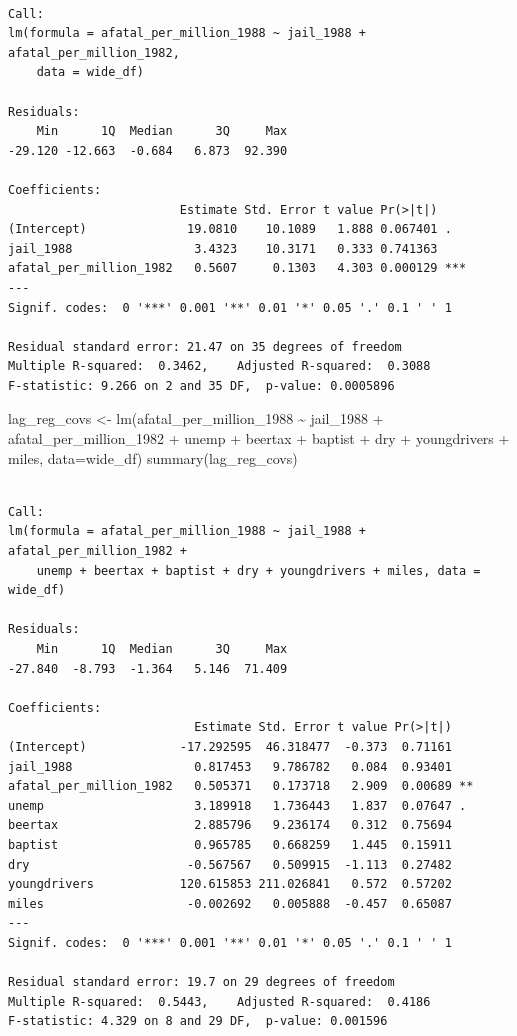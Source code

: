 \documentclass[
  letterpaper,
  DIV=11,
  numbers=noendperiod]{scrreprt}
\newenvironment{Shaded}{\begin{snugshade}}{\end{snugshade}}
\newcommand{\AttributeTok}[1]{\textcolor[rgb]{0.40,0.45,0.13}{#1}}
\newcommand{\FunctionTok}[1]{\textcolor[rgb]{0.28,0.35,0.67}{#1}}
\newcommand{\NormalTok}[1]{\textcolor[rgb]{0.00,0.23,0.31}{#1}}
\newcommand{\OtherTok}[1]{\textcolor[rgb]{0.00,0.23,0.31}{#1}}
\newcommand{\SpecialCharTok}[1]{\textcolor[rgb]{0.37,0.37,0.37}{#1}}
\begin{document}
\begin{verbatim}

Call:
lm(formula = afatal_per_million_1988 ~ jail_1988 + afatal_per_million_1982, 
    data = wide_df)

Residuals:
    Min      1Q  Median      3Q     Max 
-29.120 -12.663  -0.684   6.873  92.390 

Coefficients:
                        Estimate Std. Error t value Pr(>|t|)    
(Intercept)              19.0810    10.1089   1.888 0.067401 .  
jail_1988                 3.4323    10.3171   0.333 0.741363    
afatal_per_million_1982   0.5607     0.1303   4.303 0.000129 ***
---
Signif. codes:  0 '***' 0.001 '**' 0.01 '*' 0.05 '.' 0.1 ' ' 1

Residual standard error: 21.47 on 35 degrees of freedom
Multiple R-squared:  0.3462,    Adjusted R-squared:  0.3088 
F-statistic: 9.266 on 2 and 35 DF,  p-value: 0.0005896
\end{verbatim}

\begin{Shaded}
\begin{Highlighting}[]
\NormalTok{lag\_reg\_covs }\OtherTok{\textless{}{-}} \FunctionTok{lm}\NormalTok{(afatal\_per\_million\_1988 }\SpecialCharTok{\textasciitilde{}}\NormalTok{ jail\_1988 }\SpecialCharTok{+}\NormalTok{ afatal\_per\_million\_1982 }\SpecialCharTok{+}\NormalTok{ unemp }\SpecialCharTok{+}\NormalTok{ beertax }\SpecialCharTok{+}\NormalTok{ baptist }\SpecialCharTok{+}\NormalTok{ dry }\SpecialCharTok{+}\NormalTok{ youngdrivers }\SpecialCharTok{+}\NormalTok{ miles, }\AttributeTok{data=}\NormalTok{wide\_df)}
\FunctionTok{summary}\NormalTok{(lag\_reg\_covs)}
\end{Highlighting}
\end{Shaded}

\begin{verbatim}

Call:
lm(formula = afatal_per_million_1988 ~ jail_1988 + afatal_per_million_1982 + 
    unemp + beertax + baptist + dry + youngdrivers + miles, data = wide_df)

Residuals:
    Min      1Q  Median      3Q     Max 
-27.840  -8.793  -1.364   5.146  71.409 

Coefficients:
                          Estimate Std. Error t value Pr(>|t|)   
(Intercept)             -17.292595  46.318477  -0.373  0.71161   
jail_1988                 0.817453   9.786782   0.084  0.93401   
afatal_per_million_1982   0.505371   0.173718   2.909  0.00689 **
unemp                     3.189918   1.736443   1.837  0.07647 . 
beertax                   2.885796   9.236174   0.312  0.75694   
baptist                   0.965785   0.668259   1.445  0.15911   
dry                      -0.567567   0.509915  -1.113  0.27482   
youngdrivers            120.615853 211.026841   0.572  0.57202   
miles                    -0.002692   0.005888  -0.457  0.65087   
---
Signif. codes:  0 '***' 0.001 '**' 0.01 '*' 0.05 '.' 0.1 ' ' 1

Residual standard error: 19.7 on 29 degrees of freedom
Multiple R-squared:  0.5443,    Adjusted R-squared:  0.4186 
F-statistic: 4.329 on 8 and 29 DF,  p-value: 0.001596
\end{verbatim}
\end{document}
